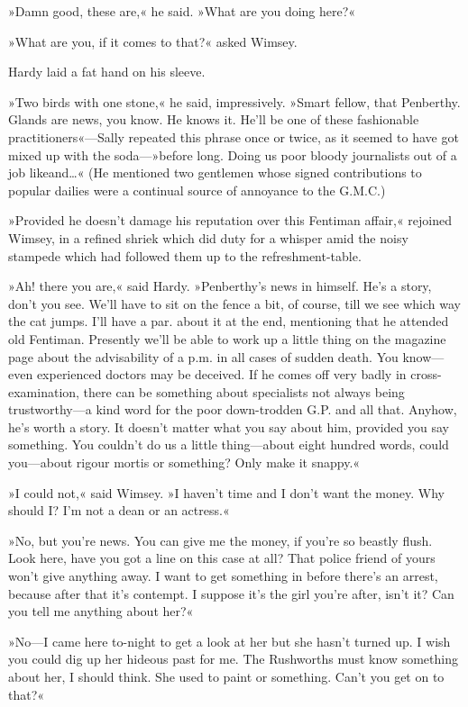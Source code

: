 »Damn good, these are,« he said. »What are you doing here?«

»What are you, if it comes to that?« asked Wimsey.

Hardy laid a fat hand on his sleeve.

»Two birds with one stone,« he said, impressively. »Smart fellow, that Penberthy. Glands are news, you know. He knows it. He'll be one of these fashionable practitioners«—Sally repeated this phrase once or twice, as it seemed to have got mixed up with the soda—»before long. Doing us poor bloody journalists out of a job like\textellipsis  and\dots« (He mentioned two gentlemen whose signed contributions to popular dailies were a continual source of annoyance to the G.M.C.)

»Provided he doesn't damage his reputation over this Fentiman affair,« rejoined Wimsey, in a refined shriek which did duty for a whisper amid the noisy stampede which had followed them up to the refreshment-table.

»Ah! there you are,« said Hardy. »Penberthy's news in himself. He's a story, don't you see. We'll have to sit on the fence a bit, of course, till we see which way the cat jumps. I'll have a par. about it at the end, mentioning that he attended old Fentiman. Presently we'll be able to work up a little thing on the magazine page about the advisability of a p.m. in all cases of sudden death. You know—even experienced doctors may be deceived. If he comes off very badly in cross-examination, there can be something about specialists not always being trustworthy—a kind word for the poor down-trodden G.P. and all that. Anyhow, he's worth a story. It doesn't matter what you say about him, provided you say something. You couldn't do us a little thing—about eight hundred words, could you—about rigour mortis or something? Only make it snappy.«

»I could not,« said Wimsey. »I haven't time and I don't want the money. Why should I? I'm not a dean or an actress.«

»No, but you're news. You can give me the money, if you're so beastly flush. Look here, have you got a line on this case at all? That police friend of yours won't give anything away. I want to get something in before there's an arrest, because after that it's contempt. I suppose it's the girl you're after, isn't it? Can you tell me anything about her?«

»No—I came here to-night to get a look at her but she hasn't turned up. I wish you could dig up her hideous past for me. The Rushworths must know something about her, I should think. She used to paint or something. Can't you get on to that?«

